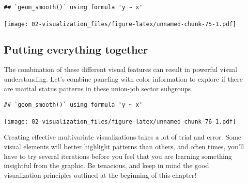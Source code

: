 \documentclass[
]{book}
\newenvironment{Shaded}{\begin{snugshade}}{\end{snugshade}}
\newcommand{\CommentTok}[1]{\textcolor[rgb]{0.56,0.35,0.01}{\textit{#1}}}
\newcommand{\DataTypeTok}[1]{\textcolor[rgb]{0.13,0.29,0.53}{#1}}
\newcommand{\KeywordTok}[1]{\textcolor[rgb]{0.13,0.29,0.53}{\textbf{#1}}}
\newcommand{\NormalTok}[1]{#1}
\newcommand{\OperatorTok}[1]{\textcolor[rgb]{0.81,0.36,0.00}{\textbf{#1}}}
\newcommand{\StringTok}[1]{\textcolor[rgb]{0.31,0.60,0.02}{#1}}
\begin{document}
\begin{verbatim}
## `geom_smooth()` using formula 'y ~ x'
\end{verbatim}

\texttt{[image: 02-visualization\_files/figure-latex/unnamed-chunk-75-1.pdf]}

\hypertarget{putting-everything-together}{%
\subsection{Putting everything together}\label{putting-everything-together}}

The combination of these different visual features can result in powerful visual understanding. Let's combine paneling with color information to explore if there are marital status patterns in these union-job sector subgroups.

\begin{Shaded}
\end{Shaded}

\begin{verbatim}
## `geom_smooth()` using formula 'y ~ x'
\end{verbatim}

\texttt{[image: 02-visualization\_files/figure-latex/unnamed-chunk-76-1.pdf]}

Creating effective multivariate visualizations takes a lot of trial and error. Some visual elements will better highlight patterns than others, and often times, you'll have to try several iterations before you feel that you are learning something insightful from the graphic. Be tenacious, and keep in mind the good visualization principles outlined at the beginning of this chapter!
\end{document}
